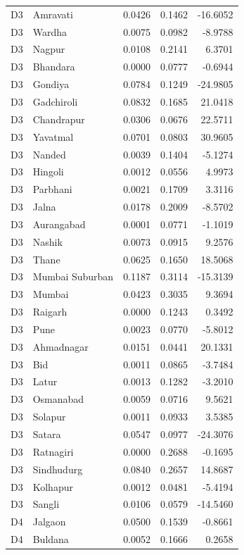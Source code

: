 \documentclass[11pt,a4paper]{report}
\begin{document}
\begin{longtable}{l>{\raggedright\arraybackslash}p{5cm}rrr}
D3 & Amravati & 0.0426 & 0.1462 & -16.6052 \\
D3 & Wardha & 0.0075 & 0.0982 & -8.9788 \\
D3 & Nagpur & 0.0108 & 0.2141 & 6.3701 \\
D3 & Bhandara & 0.0000 & 0.0777 & -0.6944 \\
D3 & Gondiya & 0.0784 & 0.1249 & -24.9805 \\
D3 & Gadchiroli & 0.0832 & 0.1685 & 21.0418 \\
D3 & Chandrapur & 0.0306 & 0.0676 & 22.5711 \\
D3 & Yavatmal & 0.0701 & 0.0803 & 30.9605 \\
D3 & Nanded & 0.0039 & 0.1404 & -5.1274 \\
D3 & Hingoli & 0.0012 & 0.0556 & 4.9973 \\
D3 & Parbhani & 0.0021 & 0.1709 & 3.3116 \\
D3 & Jalna & 0.0178 & 0.2009 & -8.5702 \\
D3 & Aurangabad & 0.0001 & 0.0771 & -1.1019 \\
D3 & Nashik & 0.0073 & 0.0915 & 9.2576 \\
D3 & Thane & 0.0625 & 0.1650 & 18.5068 \\
D3 & Mumbai Suburban & 0.1187 & 0.3114 & -15.3139 \\
D3 & Mumbai & 0.0423 & 0.3035 & 9.3694 \\
D3 & Raigarh & 0.0000 & 0.1243 & 0.3492 \\
D3 & Pune & 0.0023 & 0.0770 & -5.8012 \\
D3 & Ahmadnagar & 0.0151 & 0.0441 & 20.1331 \\
D3 & Bid & 0.0011 & 0.0865 & -3.7484 \\
D3 & Latur & 0.0013 & 0.1282 & -3.2010 \\
D3 & Osmanabad & 0.0059 & 0.0716 & 9.5621 \\
D3 & Solapur & 0.0011 & 0.0933 & 3.5385 \\
D3 & Satara & 0.0547 & 0.0977 & -24.3076 \\
D3 & Ratnagiri & 0.0000 & 0.2688 & -0.1695 \\
D3 & Sindhudurg & 0.0840 & 0.2657 & 14.8687 \\
D3 & Kolhapur & 0.0012 & 0.0481 & -5.4194 \\
D3 & Sangli & 0.0106 & 0.0579 & -14.5460 \\
D4 & Jalgaon & 0.0500 & 0.1539 & -0.8661 \\
D4 & Buldana & 0.0052 & 0.1666 & 0.2658 \\

\end{longtable}
\end{document}

